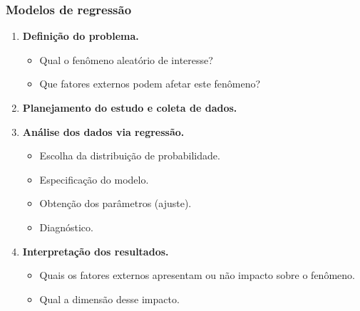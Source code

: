 \documentclass[10pt,
  aspectratio=169,
  serif,
  mathserif,
  professionalfont,
  compress,
  handout,
  ]{beamer}\usepackage[]{graphicx}\usepackage[]{color}
\begin{document}


\begin{frame}
  \frametitle{Modelos de regressão}

  \begin{enumerate}
    \itemsep 2ex
    
      \item \textbf{Definição do problema.}
      
      \begin{itemize}
        \item Qual o fenômeno aleatório de interesse?
        \item Que fatores externos podem afetar este fenômeno?
      \end{itemize}

      
      \item \textbf{Planejamento do estudo e coleta de dados.}
      
      \item \textbf{Análise dos dados via regressão.}
      
        \begin{itemize}
          \item Escolha da distribuição de probabilidade.
          \item Especificação do modelo.
          \item Obtenção dos parâmetros (ajuste).
          \item Diagnóstico.
        \end{itemize}
      
      \item \textbf{Interpretação dos resultados.}
      
        \begin{itemize}
          \item Quais os fatores externos apresentam ou não impacto sobre o fenômeno.
          \item Qual a dimensão desse impacto.
        \end{itemize}      
  
  \end{enumerate}
\end{frame}

\end{document}
